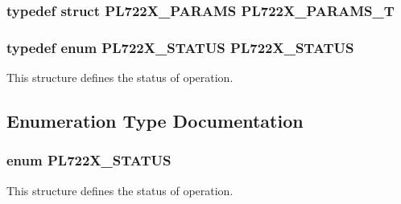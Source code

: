 \label{a00486_a2d33321bbdef2f4ed4a14fa4c375a1ad}
\hypertarget{a00486_a821a0c1a5a145063f260d31fad400bd4}{
\subsubsection[{PL722X\_\-PARAMS\_\-T}]{\setlength{\rightskip}{0pt plus 5cm}typedef struct {\bf PL722X\_\-PARAMS} {\bf PL722X\_\-PARAMS\_\-T}}}
\label{a00486_a821a0c1a5a145063f260d31fad400bd4}
\hypertarget{a00486_ac4ecf097ed33a9b5d098d1ea1235d6ad}{
\subsubsection[{PL722X\_\-STATUS}]{\setlength{\rightskip}{0pt plus 5cm}typedef enum {\bf PL722X\_\-STATUS} {\bf PL722X\_\-STATUS}}}
\label{a00486_ac4ecf097ed33a9b5d098d1ea1235d6ad}


This structure defines the status of operation. 



\subsection{Enumeration Type Documentation}
\hypertarget{a00486_a2bb5dcead34a0fa5b7fca8986b66fa8c}{
\subsubsection[{PL722X\_\-STATUS}]{\setlength{\rightskip}{0pt plus 5cm}enum {\bf PL722X\_\-STATUS}}}
\label{a00486_a2bb5dcead34a0fa5b7fca8986b66fa8c}


This structure defines the status of operation. 

